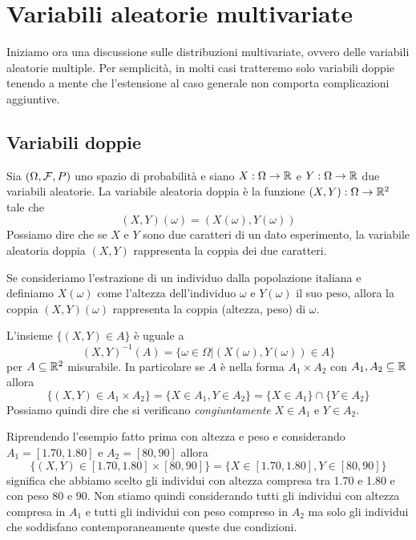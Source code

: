 \chapter{Variabili aleatorie multivariate}
Iniziamo ora una discussione sulle distribuzioni multivariate, ovvero delle variabili aleatorie
multiple. Per semplicità, in molti casi tratteremo solo variabili doppie tenendo a mente che
l'estensione al caso generale non comporta complicazioni aggiuntive.

\section{Variabili doppie}
Sia $(\Omega, \mathcal{F}, P)$ uno spazio di probabilità e siano $X : \Omega \to \mathbb{R}$ e $Y : \Omega \to \mathbb{R}$
due variabili aleatorie. La variabile aleatoria doppia è la funzione $(X, Y) : \Omega \to \mathbb{R}^2$
tale che
\[ (X, Y)(\omega) = (X(\omega), Y(\omega)) \]
Possiamo dire che se $X$ e $Y$ sono due caratteri di un dato esperimento, la variabile aleatoria
doppia $(X, Y)$ rappresenta la coppia dei due caratteri.

\begin{example}
	Se consideriamo l'estrazione di un individuo dalla popolazione italiana e definiamo $X(\omega)$
	come l'altezza dell'individuo $\omega$ e $Y(\omega)$ il suo peso, allora la coppia
	$(X, Y)(\omega)$ rappresenta la coppia (altezza, peso) di $\omega$.
\end{example}

L'insieme $\{ (X, Y) \in A \}$ è uguale a
\[ (X, Y)^{-1} (A) = \{ \omega \in \Omega | (X(\omega), Y(\omega)) \in A \} \]
per $A \subseteq \mathbb{R}^2$ misurabile. In particolare se $A$ è nella forma $A_1 \times A_2$ con
$A_1, A_2 \subseteq \mathbb{R}$ allora
\[
	\{ (X, Y) \in A_1 \times A_2 \} = \{ X \in A_1, Y \in A_2 \} =
	\{ X \in A_1 \} \cap \{ Y \in A_2 \}
\]
Possiamo quindi dire che si verificano \emph{congiuntamente} $X \in A_1$ e $Y \in A_2$.

\begin{example}
	Riprendendo l'esempio fatto prima con altezza e peso e considerando $A_1 = [1.70, 1.80]$ e
	$A_2 = [80, 90]$ allora
	\[ \{ (X, Y) \in [1.70, 1.80] \times [80, 90] \} = \{ X \in [1.70, 1.80], Y \in [80, 90] \} \]
	significa che abbiamo scelto gli individui con altezza compresa tra 1.70 e 1.80 e con peso
	80 e 90. Non stiamo quindi considerando tutti gli individui con altezza compresa in $A_1$ e
	tutti gli individui con peso compreso in $A_2$ ma solo gli individui che soddisfano
	contemporaneamente queste due condizioni.
\end{example}

